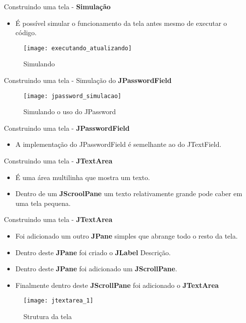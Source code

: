 \documentclass[10pt]{beamer}
\begin{document}
\begin{frame}{Construindo uma tela - \textbf{Simulação}} 
\begin{itemize}
\item É possível simular o funcionamento da tela antes mesmo de executar o código.
\end{itemize}
\begin{figure}[!htb]
    \centering
    \texttt{[image: executando\_atualizando]}
    \caption{Simulando}
    \label{figRotulo}
  \end{figure}
\end{frame}{}

\begin{frame}{Construindo uma tela - Simulação do \textbf{JPasswordField}} 
\begin{figure}[!htb]
    \centering
    \texttt{[image: jpassword\_simulacao]}
    \caption{Simulando o uso do JPassword}
    \label{figRotulo}
  \end{figure}
\end{frame}{}

\begin{frame}{Construindo uma tela - \textbf{JPasswordField}}
\begin{itemize}
\item A implementação do JPasswordField é semelhante ao do JTextField.
\end{itemize}

\end{frame}{}

\begin{frame}{Construindo uma tela - \textbf{JTextArea}}
\begin{itemize}
\item É uma área multilinha que mostra um texto.
\item Dentro de um \textbf{JScroolPane} um texto relativamente grande pode caber em uma tela pequena.
\end{itemize}
\end{frame}{}

\begin{frame}{Construindo uma tela - \textbf{JTextArea}}
\begin{itemize}
\item Foi adicionado um outro \textbf{JPane} simples que abrange todo o resto da tela.
\item Dentro deste \textbf{JPane} foi criado o \textbf{JLabel} Descrição.
\item Dentro deste \textbf{JPane} foi adicionado um \textbf{JScrollPane}.
\item Finalmente dentro deste \textbf{JScrollPane} foi adicionado o \textbf{JTextArea}

\end{itemize}
\begin{figure}[!htb]
    \centering
    \texttt{[image: jtextarea\_1]}
    \caption{Strutura da tela}
    \label{figRotulo}
  \end{figure}
\end{frame}{}
\end{document}
